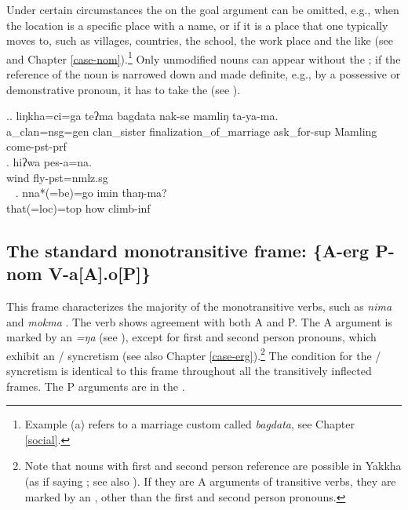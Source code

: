 Under certain circumstances the  on the goal argument can be omitted, e.g., when the location is a specific place with a name, or if it is a place that one typically moves to, such as villages, countries, the school, the work place and the like (see \Next and Chapter \ref{case-nom}).\footnote{Example (a) refers to a marriage custom called \emph{bagdata}, see Chapter \ref{social}.}  Only unmodified nouns can appear without the ; if the reference of the noun is narrowed down and made definite, e.g., by a possessive or demonstrative pronoun, it has to take the   (see \Next[c]).   

\ex.\ag. liŋkha=ci=ga teʔma  bagdata nak-se mamliŋ ta-ya-ma.\\
	a\_clan{\sc =nsg=gen} clan\_sister finalization\_of\_marriage ask\_for{\sc -sup} Mamling  come{\sc [3sg]-pst-prf}\\
	 
\bg. hiʔwa pes-a=na.\\
wind fly{\sc [3sg]-pst=nmlz.sg}\\\
 
\bg. nna*(=be)=go imin thaŋ-ma?\\
that{\sc *(=loc)=top} how climb{\sc -inf} \\
 



\subsection[The standard monotransitive frame]{The standard monotransitive frame: \{A-{\sc erg} P-{\sc nom} V-a[A].o[P]\}}\label{stand-tr}


\noindent
This frame characterizes the majority of the monotransitive verbs, such as \emph{nima}  and  \emph{mokma} . The verb shows agreement with both A and P. The A argument is  marked by an   \emph{=ŋa} (see \Next[a]), except for first and second person pronouns, which exhibit an / syncretism (see also Chapter \ref{case-erg}).\footnote{Note that nouns with first and second person reference are possible in Yakkha (as if saying ; see also ). If they are A arguments of transitive verbs, they are marked by an , other than the first and second person pronouns.} The condition for the / syncretism is identical to this frame throughout all the transitively inflected frames. The P arguments are in the  . 

